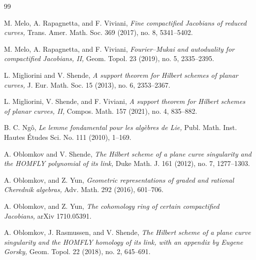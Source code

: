 \documentclass{pspum-l}
\theoremstyle{plain}
\theoremstyle{definition}
\theoremstyle{remark}
\begin{document}
\begin{thebibliography}{99}


 M. Melo, A. Rapagnetta, and F. Viviani, {\em Fine compactified Jacobians of reduced curves,} Trans. Amer. Math. Soc. 369 (2017), no. 8, 5341--5402.

 M. Melo, A. Rapagnetta, and F. Viviani, {\em Fourier--Mukai and autoduality for compactified Jacobians, II,} Geom. Topol. 23 (2019), no. 5, 2335--2395.










 L. Migliorini and V. Shende, {\em A support theorem for Hilbert schemes of planar curves,} J. Eur. Math. Soc. 15 (2013), no. 6, 2353--2367.




 L. Migliorini, V. Shende, and F. Viviani, {\em A support theorem for Hilbert schemes of planar curves, II,} Compos. Math. 157 (2021), no. 4, 835--882.



 B. C. Ng\^{o}, {\em Le lemme fondamental pour les alg\`{e}bres de Lie,} Publ. Math. Inst. Hautes \'Etudes Sci. No. 111 (2010), 1--169.



 A. Oblomkov and V. Shende, {\em The Hilbert scheme of a plane curve singularity and the HOMFLY polynomial
of its link,} Duke Math. J. 161 (2012), no. 7, 1277--1303.


 A. Oblomkov, and Z. Yun, {\em Geometric representations of graded and rational Cherednik algebras,} Adv. Math. 292 (2016), 601--706.

  A. Oblomkov, and Z. Yun, {\em The cohomology ring of certain compactified Jacobians, } arXiv 1710.05391.


 A. Oblomkov, J. Rasmussen, and V. Shende, {\em The Hilbert scheme of a plane curve singularity and the HOMFLY homology of its link, with an appendix by Eugene Gorsky,} Geom. Topol. 22 (2018), no. 2,
645--691.




\end{thebibliography}
\end{document}
